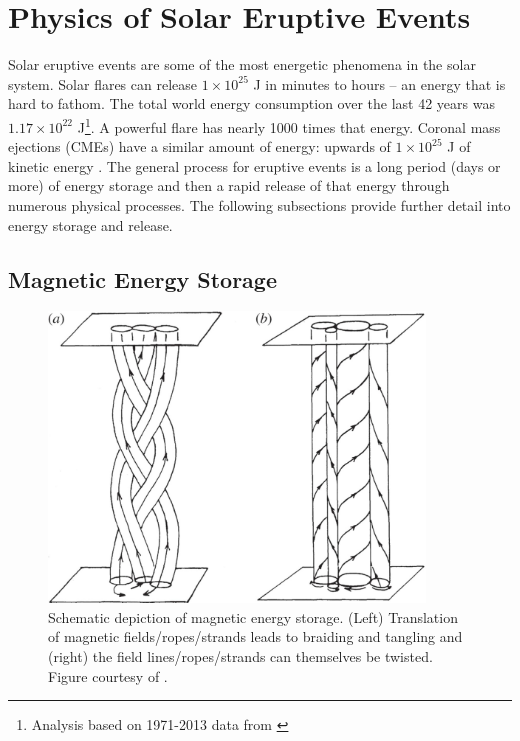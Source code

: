 \section{Physics of Solar Eruptive Events}
\label{sec:physicssolareruptiveevents}
Solar eruptive events are some of the most energetic phenomena in the solar system. Solar flares can release $1 \times 10^{25}$ J in minutes to hours \citep{Woods2006} -- an energy that is hard to fathom. The total world energy consumption over the last 42 years was $1.17 \times 10^{22}$ J\footnote{Analysis based on 1971-2013 data from \citet{iea2015}}. A powerful flare has nearly 1000 times that energy. Coronal mass ejections (CMEs) have a similar amount of energy: upwards of $1 \times 10 ^{25}$ J of kinetic energy \citep{Vourlidas2010a}. The general process for eruptive events is a long period (days or more) of energy storage and then a rapid release of that energy through numerous physical processes. The following subsections provide further detail into energy storage and release.

\subsection{Magnetic Energy Storage}

\begin{figure}[!h]
    \begin{center}
	    \includegraphics[width=100mm]{Images/MagneticEnergyStorage.png}
    \end{center}
    \caption[Magnetic energy storage diagram]{
        Schematic depiction of magnetic energy storage. (Left) Translation of magnetic fields/ropes/strands leads to 
        braiding and tangling and (right) the field lines/ropes/strands can themselves be twisted. Figure courtesy of 
        \citet{Klimchuk2015}. 
    }
    \label{fig:magneticenergystorage}
\end{figure}

